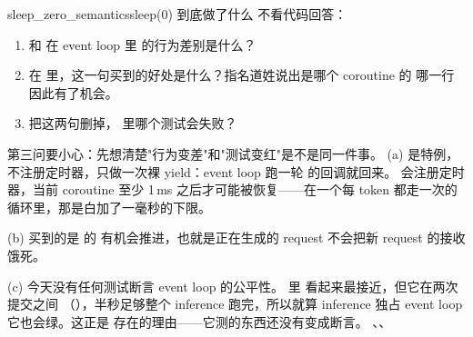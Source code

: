 \begin{checkpoint}{sleep_zero_semantics}{sleep(0) 到底做了什么}
不看代码回答：
\begin{enumerate}[label=(\alph*)]
  \item {} 和  在 event loop 里
        的行为差别是什么？
  \item 在  里，这一句买到的好处是什么？指名道姓说出是哪个 coroutine 的
        哪一行因此有了机会。
  \item 把这两句删掉， 里哪个测试会失败？
\end{enumerate}
\hint 第三问要小心：先想清楚"行为变差"和"测试变红"是不是同一件事。
\ifshowanswers
\tcblower
\answer (a)  是特例，不注册定时器，只做一次裸 yield：event loop 跑一轮
 的回调就回来。 会注册定时器，当前 coroutine 至少 1\,ms
之后才可能被恢复——在一个每 token 都走一次的循环里，那是白加了一毫秒的下限。

(b) 买到的是  的
 有机会推进，也就是正在生成的 request
不会把新 request 的接收饿死。

(c)  今天没有任何测试断言 event loop 的公平性。
 里 
看起来最接近，但它在两次提交之间 
（），半秒足够整个 inference 跑完，所以就算 inference
独占 event loop 它也会绿。这正是  存在的理由——它测的东西还没有变成断言。
\whereincode {}、、
\fi
\end{checkpoint}

